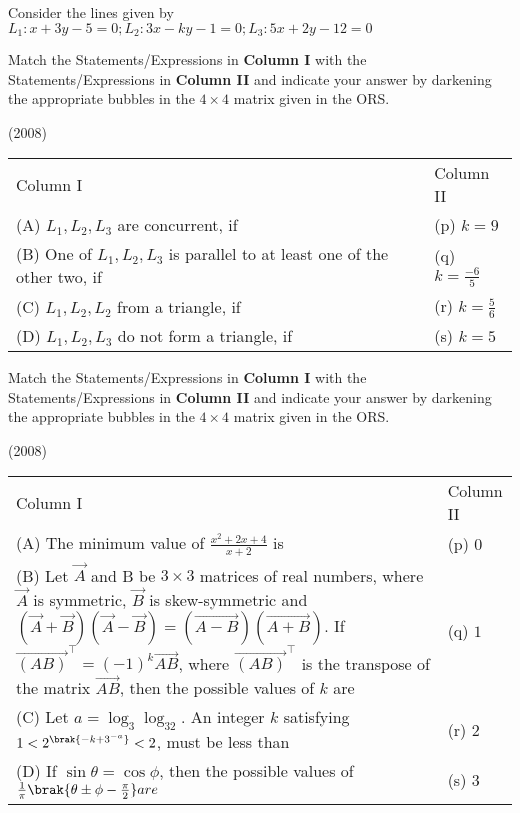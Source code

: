 \iffalse
\title{ASSIGNMENT - 2}
\author{EE24BTECH11019 - DWARAK A}
\section{matrix-match}
\fi

	\item Consider the lines given by
		$L_1:x+3y-5=0; L_2:3x-ky-1=0; L_3:5x+2y-12=0$

		Match the Statements/Expressions in \textbf{Column I} with the Statements/Expressions in \textbf{Column II} and indicate your answer by darkening the appropriate bubbles in the $4\times4$ matrix given in the ORS.

		\hfill(2008)

		\begin{tabular}{p{12cm} p{3cm}}
			Column I & Column II \\
			(A) $L_1,L_2,L_3$ are concurrent, if & (p) $k=9$ \\
			(B) One of $L_1,L_2,L_3$ is parallel to at least one of the other two, if & (q) $k=\frac{-6}{5}$ \\
			(C) $L_1,L_2,L_2$ from a triangle, if & (r) $k=\frac{5}{6}$ \\
			(D) $L_1,L_2,L_3$ do not form a triangle, if & (s) $k=5$
		\end{tabular}


	\item  Match the Statements/Expressions in \textbf{Column I} with the Statements/Expressions in \textbf{Column II} and indicate your answer by darkening the appropriate bubbles in the $4\times4$ matrix given in the ORS.

		\hfill(2008)

		\begin{tabular}{p{12cm} p{3cm}}
			Column I & Column II \\
			(A) The minimum value of $\frac{x^2+2x+4}{x+2}$ is & (p) $0$ \\
			(B) Let $\vec{A}$ and B be $3\times3$ matrices of real numbers, where $\vec{A}$ is symmetric, $\vec{B}$ is skew-symmetric and $(\vec{A}+\vec{B})(\vec{A}-\vec{B})=(\vec{A-B})(\vec{A+B})$. If $\vec{(AB)}^\top=(-1)^k\vec{AB}$, where $\vec{(AB)}^\top$ is the transpose of the matrix $\vec{AB}$, then the possible values of $k$ are & (q) $1$ \\
			(C) Let $a=\log_3\log_32$. An integer $k$ satisfying $1<2^{\brak{-k+3^{-a}}}<2$, must be less than & (r) $2$ \\
			(D) If $\sin\theta=\cos\phi$, then the possible values of $\frac{1}{\pi}\brak{\theta\pm\phi-\frac{\pi}{2}} are $ & (s) $3$
		\end{tabular}
